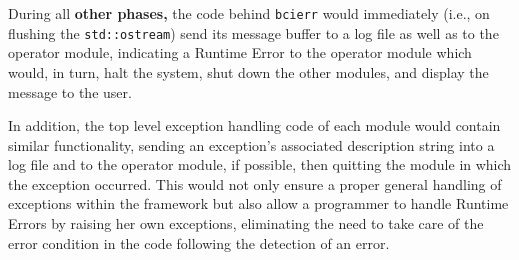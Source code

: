 \documentclass[12pt,a4paper]{article}
\begin{document}
During all \textbf{other phases,} the code behind \texttt{bcierr}
would immediately (i.e., on flushing the \texttt{std::ostream})
send its message buffer to a log file as well as to
the operator module, indicating a {Runtime Error} 
to the operator module which would, in turn, halt the system,
shut down the other modules, and display the message to the
user.

In addition, the top level exception handling code
of each module would contain similar functionality,
sending an exception's associated description string into
a log file and to the operator module, if possible, then
quitting the module in which the exception occurred.
This would not only ensure
a proper general handling of exceptions within the framework but
also allow a programmer to handle {Runtime Errors} by raising
her own exceptions, eliminating the need to take care of the error
condition in the code following the detection of an error.

%
%
%
%
%
%
%
%
%
\end{document}
